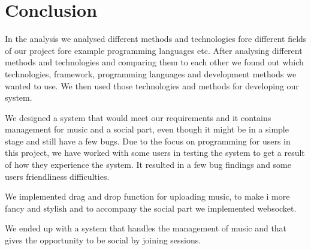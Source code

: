 \section{Conclusion}
In the analysis we analysed different methods and technologies fore different fields of our project fore example programming languages etc. After analysing different methods and technologies and comparing them to each other we found out which technologies, framework, programming languages and development methods we wanted to use. We then used those technologies and methods for developing our system.

We designed a system that would meet our requirements and it contains management for music and a social part, even though it might be in a simple stage and still have a few bugs. Due to the focus on programming for users in this project, we have worked with some users in testing the system to get a result of how they experience the system. It resulted in a few bug findings and some users friendliness difficulties.

We implemented drag and drop function for uploading music, to make i more fancy and stylish and to accompany the social part we implemented websocket.   
 
We ended up with a system that handles the management of music and that gives the opportunity to be social by joining sessions.